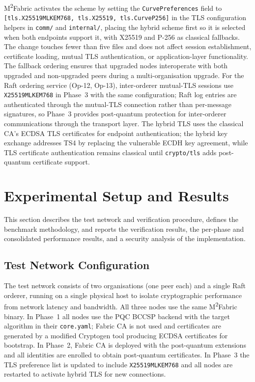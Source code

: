 \documentclass{ieeetj}
\newcommand{\mfabric}{M\textsuperscript{2}Fabric}
\begin{document}
\mfabric{} activates the scheme by setting the \texttt{CurvePreferences} field to
\texttt{[tls.X25519MLKEM768, tls.X25519, tls.CurveP256]} in the TLS configuration
helpers in \texttt{comm/} and \texttt{internal/}, placing the hybrid scheme first
so it is selected when both endpoints support it, with X25519 and P-256 as
classical fallbacks. The change touches fewer than five files and does not affect
session establishment, certificate loading, mutual TLS authentication, or
application-layer functionality. The fallback ordering ensures that upgraded
nodes interoperate with both upgraded and non-upgraded peers during a
multi-organisation upgrade. For the Raft ordering service (Op-12, Op-13),
inter-orderer mutual-TLS sessions use \texttt{X25519MLKEM768} in Phase~3 with the
same configuration; Raft log entries are authenticated through the mutual-TLS
connection rather than per-message signatures, so Phase~3 provides post-quantum
protection for inter-orderer communications through the transport layer. The
hybrid TLS uses the classical CA's ECDSA TLS certificates for endpoint
authentication; the hybrid key exchange addresses TS4 by replacing the vulnerable
ECDH key agreement, while TLS certificate authentication remains classical until
\texttt{crypto/tls} adds post-quantum certificate support.

\section{Experimental Setup and Results} \label{sec:experimental}

This section describes the test network and verification procedure, defines the
benchmark methodology, and reports the verification results, the per-phase and
consolidated performance results, and a security analysis of the implementation.

\subsection{Test Network Configuration}
\label{sec:exp_testnet}

The test network consists of two organisations (one peer each) and a single
Raft orderer, running on a single physical host to isolate cryptographic
performance from network latency and bandwidth. All three nodes use the same
\mfabric{} binary. In Phase~1 all nodes use the PQC BCCSP backend with the target
algorithm in their \texttt{core.yaml}; Fabric CA is not used and certificates are
generated by a modified Cryptogen tool producing ECDSA certificates for
bootstrap. In Phase~2, Fabric CA is deployed with the post-quantum extensions and
all identities are enrolled to obtain post-quantum certificates. In Phase~3 the
TLS preference list is updated to include \texttt{X25519MLKEM768} and all nodes
are restarted to activate hybrid TLS for new connections.
\end{document}

